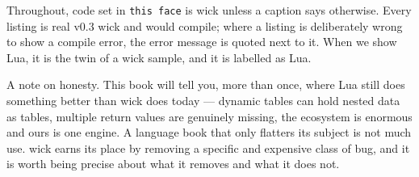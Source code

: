 Throughout, code set in \texttt{this face} is wick unless a caption says
otherwise. Every listing is real v0.3 wick and would compile; where a listing
is deliberately wrong to show a compile error, the error message is quoted
next to it. When we show Lua, it is the twin of a wick sample, and it is
labelled as Lua.

A note on honesty. This book will tell you, more than once, where Lua still
does something better than wick does today --- dynamic tables can hold nested data as
tables, multiple return values are genuinely missing, the ecosystem is
enormous and ours is one engine. A language book that only flatters its
subject is not much use. wick earns its place by removing a specific and
expensive class of bug, and it is worth being precise about what it removes
and what it does not.
